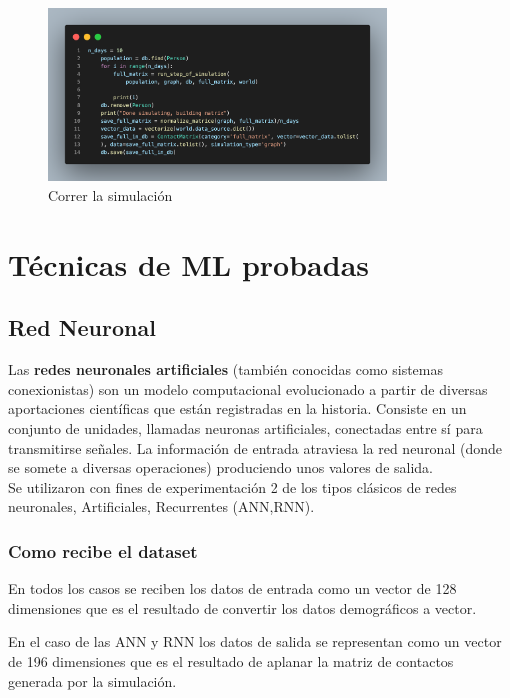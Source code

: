 \documentclass{article}
\begin{document}
\begin{figure}[h]
        \centering
        \includegraphics[height=0.3\textheight, width=0.8\textwidth]{run_simulation.png}
        \centering
        \caption{Correr la simulación}
\end{figure}

\vspace{1.5cm}

\section{Técnicas de ML probadas }
\subsection{Red Neuronal}
Las \textbf{redes neuronales artificiales} (también conocidas como sistemas conexionistas) son un modelo computacional evolucionado a partir de diversas aportaciones científicas que están registradas en la historia\cite{5}. Consiste en un conjunto de unidades, llamadas neuronas artificiales, conectadas entre sí para transmitirse señales. La información de entrada atraviesa la red neuronal (donde se somete a diversas operaciones) produciendo unos valores de salida.\\
Se utilizaron con fines de experimentación 2 de los tipos clásicos de redes neuronales, Artificiales, Recurrentes (ANN,RNN).

\subsubsection*{Como recibe el dataset}
En todos los casos se reciben los datos de entrada como un vector de 128 dimensiones que es el resultado de convertir los datos demográficos a vector.

En el caso de las ANN y RNN los datos de salida se representan como un vector de 196 dimensiones que es el resultado de aplanar la matriz de contactos generada por la simulación.
\end{document}
